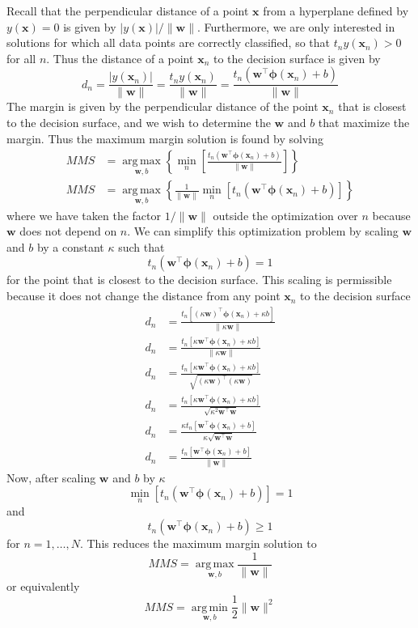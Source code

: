 \documentclass[12pt]{article}
\newcommand{\lp}{\left(}
\newcommand{\rp}{\right)}
\newcommand{\lb}{\left[}
\newcommand{\rb}{\right]}
\newcommand{\x}{\mathbf{x}}
\newcommand{\w}{\mathbf{w}}
\newcommand{\yOfX}{y\left(\x\right)}
\newcommand{\yOfXn}{y\left(\x_n\right)}
\newcommand{\phiOfXn}{\mathbf{\phi}\left(\x_n\right)}
\newcommand{\wTPhiOfXn}{\w^\top\phiOfXn}
\DeclareMathOperator*{\argmax}{arg\,max}
\DeclareMathOperator*{\argmin}{arg\,min}
\begin{document}
Recall that the perpendicular distance of a point $\x$ from a hyperplane defined
by $\yOfX = 0$ is given by $|\yOfX|/\|\w\|$. Furthermore, we are only interested
in solutions for which all data points are correctly classified, so that
$t_n\yOfXn > 0$ for all $n$. Thus the distance of a point $\x_n$ to the decision
surface is given by
%
\begin{equation*}
  d_n =
  \frac{|\yOfXn|}{\|\w\|} =
  \frac{t_n\yOfXn}{\|\w\|} =
  \frac{t_n\lp\wTPhiOfXn + b\rp}{\|\w\|}
\end{equation*}
%
The margin is given by the perpendicular distance of the point $\x_n$ that is
closest to the decision surface, and we wish to determine the $\w$ and $b$ that
maximize the margin. Thus the maximum margin solution is found by solving
%
\begin{align*}
  MMS &= \underset{\w,b}{\argmax}\left\{\underset{n}{\min}\lb\frac{t_n\lp\wTPhiOfXn + b\rp}{\|\w\|}\rb\right\} \\
  MMS &= \underset{\w,b}{\argmax}\left\{\frac{1}{\|\w\|}\underset{n}{\min}\lb t_n\lp\wTPhiOfXn + b\rp\rb\right\}
\end{align*}
%
where we have taken the factor $1 / \|\w\|$ outside the optimization over $n$
because $\w$ does not depend on $n$. We can simplify this optimization problem
by scaling $\w$ and $b$ by a constant $\kappa$ such that
%
\begin{equation*}
  t_n\lp\wTPhiOfXn + b\rp = 1
\end{equation*}
%
for the point that is closest to the decision surface. This scaling is
permissible because it does not change the distance from any point $\x_n$ to the
decision surface
\begin{align*}
  d_n &= \frac{t_n\lb\lp\kappa\w\rp^\top\phiOfXn + \kappa b\rb}{\|\kappa\w\|} \\
  d_n &= \frac{t_n\lb\kappa\wTPhiOfXn + \kappa b\rb}{\|\kappa\w\|} \\
  d_n &= \frac{t_n\lb\kappa\wTPhiOfXn + \kappa b\rb}{\sqrt{\lp\kappa\w\rp^\top\lp\kappa\w\rp}} \\
  d_n &= \frac{t_n\lb\kappa\wTPhiOfXn + \kappa b\rb}{\sqrt{\kappa^2\w^\top\w}} \\
  d_n &= \frac{\kappa t_n\lb\wTPhiOfXn + b\rb}{\kappa\sqrt{\w^\top\w}} \\
  d_n &= \frac{t_n\lb\wTPhiOfXn + b\rb}{\|\w\|}
\end{align*}
%
Now, after scaling $\w$ and $b$ by $\kappa$
%
\begin{equation*}
  \underset{n}{\min}\lb t_n\lp\wTPhiOfXn + b\rp\rb = 1
\end{equation*}
%
and
%
\begin{equation*}
  t_n\lp\wTPhiOfXn + b\rp \ge 1
\end{equation*}
%
for $n = 1,\hdots,N$. This reduces the maximum margin solution to
%
\begin{equation*}
  MMS = \underset{\w,b}{\argmax}\frac{1}{\|\w\|}
\end{equation*}
%
or equivalently
%
\begin{equation*}
  MMS = \underset{\w,b}{\argmin}\frac{1}{2}\|\w\|^2
\end{equation*}
\end{document}

